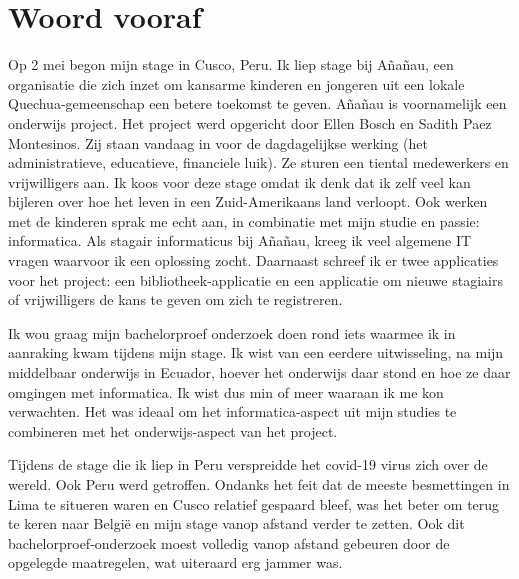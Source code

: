 
\chapter*{Woord vooraf}
\label{ch:voorwoord}


Op 2 mei begon mijn stage in Cusco, Peru. Ik liep stage bij Añañau, een organisatie die zich inzet om kansarme kinderen en jongeren uit een lokale Quechua-gemeenschap een betere toekomst te geven. Añañau is voornamelijk een onderwijs project. Het project werd opgericht door Ellen Bosch en Sadith Paez Montesinos. Zij staan vandaag in voor de dagdagelijkse werking (het administratieve, educatieve, financiele luik). Ze sturen een tiental medewerkers en vrijwilligers aan. Ik koos voor deze stage omdat ik denk dat ik zelf veel kan bijleren over hoe het leven in een Zuid-Amerikaans land verloopt. Ook werken met de kinderen sprak me echt aan, in combinatie met mijn studie en passie: informatica. Als stagair informaticus bij Añañau, kreeg ik veel algemene IT vragen waarvoor ik een oplossing zocht. Daarnaast schreef ik er twee applicaties voor het project: een bibliotheek-applicatie en een applicatie om nieuwe stagiairs of vrijwilligers de kans te geven om zich te registreren. 

Ik wou graag mijn bachelorproef onderzoek doen rond iets waarmee ik in aanraking kwam tijdens mijn stage. Ik wist van een eerdere uitwisseling, na mijn middelbaar onderwijs in Ecuador, hoever het onderwijs daar stond en hoe ze daar omgingen met informatica. Ik wist dus min of meer waaraan ik me kon verwachten. Het was ideaal om het informatica-aspect uit mijn studies te combineren met het onderwijs-aspect van het project. 

Tijdens de stage die ik liep in Peru verspreidde het covid-19 virus zich over de wereld. Ook Peru werd getroffen. Ondanks het feit dat de meeste besmettingen in Lima te situeren waren en Cusco relatief gespaard bleef, was het beter om terug te keren naar België en mijn stage vanop afstand verder te zetten. Ook dit bachelorproef-onderzoek moest volledig vanop afstand gebeuren door de opgelegde maatregelen, wat uiteraard erg jammer was.

